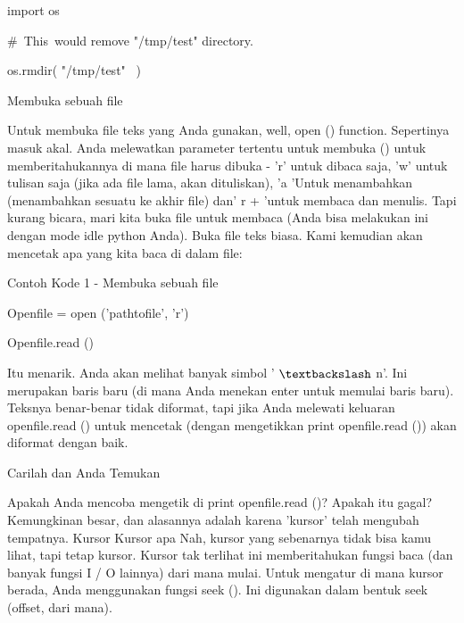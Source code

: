 \noindent 
import os \par
\vspace{12pt}
\noindent 
 $  \#  $~This~would  remove "/tmp/test"  directory. \par
\noindent 
os.rmdir( "/tmp/test"~ ) \par
\vspace{14pt}
\vspace{14pt}
\noindent 
Membuka sebuah file \par
\noindent 
\vspace{12pt}
\noindent 
Untuk membuka file teks yang Anda gunakan, well, open () function. Sepertinya masuk akal. Anda melewatkan parameter tertentu untuk membuka () untuk memberitahukannya di mana file harus dibuka - 'r' untuk dibaca saja, 'w' untuk tulisan saja (jika ada file lama, akan dituliskan), 'a 'Untuk menambahkan (menambahkan sesuatu ke akhir file) dan' r + 'untuk membaca dan menulis. Tapi kurang bicara, mari kita buka file untuk membaca (Anda bisa melakukan ini dengan mode idle python Anda). Buka file teks biasa. Kami kemudian akan mencetak apa yang kita baca di dalam file: \par
\noindent 
Contoh Kode 1 - Membuka sebuah file \par
\noindent 
\vspace{12pt}
\noindent 
Openfile = open ('pathtofile', 'r') \par
\noindent 
Openfile.read () \par
\noindent 
\vspace{12pt}
\noindent 
Itu menarik. Anda akan melihat banyak simbol ' $  \textbackslash  $ n'. Ini merupakan baris baru (di mana Anda menekan enter untuk memulai baris baru). Teksnya benar-benar tidak diformat, tapi jika Anda melewati keluaran openfile.read () untuk mencetak (dengan mengetikkan print openfile.read ()) akan diformat dengan baik. \par
\noindent 
Carilah dan Anda Temukan \par
\noindent 
\vspace{12pt}
\noindent 
Apakah Anda mencoba mengetik di print openfile.read ()? Apakah itu gagal? Kemungkinan besar, dan alasannya adalah karena 'kursor' telah mengubah tempatnya. Kursor Kursor apa Nah, kursor yang sebenarnya tidak bisa kamu lihat, tapi tetap kursor. Kursor tak terlihat ini memberitahukan fungsi baca (dan banyak fungsi I / O lainnya) dari mana mulai. Untuk mengatur di mana kursor berada, Anda menggunakan fungsi seek (). Ini digunakan dalam bentuk seek (offset, dari mana). \par
